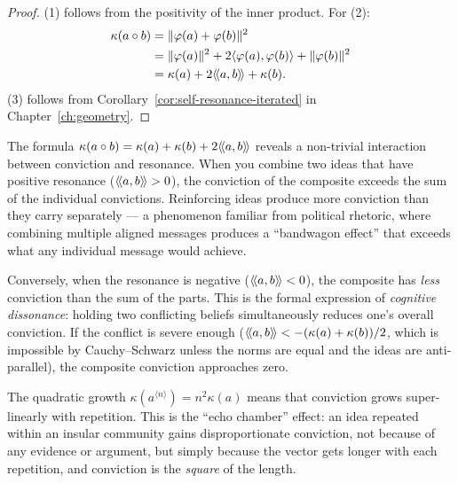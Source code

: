 \begin{proof}
(1) follows from the positivity of the inner product. For (2):
\begin{align*}
  \kappa(a \circ b)
  &= \lVert \varphi(a) + \varphi(b) \rVert^2 \\
  &= \lVert \varphi(a) \rVert^2 + 2\langle \varphi(a), \varphi(b) \rangle + \lVert \varphi(b) \rVert^2 \\
  &= \kappa(a) + 2\langle\!\langle a, b \rangle\!\rangle + \kappa(b).
\end{align*}
(3) follows from Corollary~\ref{cor:self-resonance-iterated} in
Chapter~\ref{ch:geometry}.
\end{proof}

\begin{interpretation}
\label{interp:conviction}
The formula $\kappa(a \circ b) = \kappa(a) + \kappa(b) + 2\langle\!\langle a, b \rangle\!\rangle$ reveals
a non-trivial interaction between conviction and resonance. When you combine two
ideas that have positive resonance ($\langle\!\langle a, b \rangle\!\rangle > 0$), the conviction of the
composite exceeds the sum of the individual convictions. Reinforcing ideas
produce more conviction than they carry separately --- a phenomenon familiar
from political rhetoric, where combining multiple aligned messages produces a
``bandwagon effect'' that exceeds what any individual message would achieve.

Conversely, when the resonance is negative ($\langle\!\langle a, b \rangle\!\rangle < 0$), the composite has
\emph{less} conviction than the sum of the parts. This is the formal expression
of \emph{cognitive dissonance}: holding two conflicting beliefs simultaneously
reduces one's overall conviction. If the conflict is severe enough
($\langle\!\langle a, b \rangle\!\rangle < -(\kappa(a) + \kappa(b))/2$, which is impossible by
Cauchy--Schwarz unless the norms are equal and the ideas are anti-parallel),
the composite conviction approaches zero.

The quadratic growth $\kappa(a^{\langle n \rangle}) = n^2 \kappa(a)$ means that
conviction grows super-linearly with repetition. This is the ``echo chamber''
effect: an idea repeated within an insular community gains disproportionate
conviction, not because of any evidence or argument, but simply because the
vector gets longer with each repetition, and conviction is the \emph{square}
of the length.
\end{interpretation}

